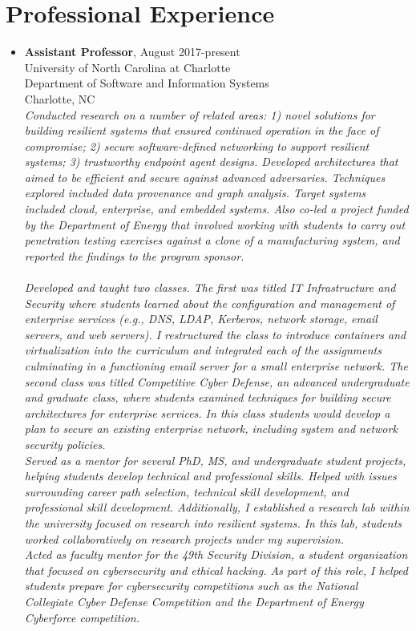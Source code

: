 \documentclass[10pt]{article}
\providecommand{\tightlist}{%
  \setlength{\itemsep}{0.25em}}
\begin{document}
\hypertarget{professional-experience}{%
\section{Professional Experience}\label{professional-experience}}

\begin{itemize}
\tightlist
\item \textbf{Assistant Professor}, August 2017-present\\
  University of North Carolina at Charlotte\\
  Department of Software and Information Systems\\
  Charlotte, NC\\
  \textit{
Conducted research on a number of related areas: 1) novel solutions for building resilient systems that ensured continued operation in the face of compromise; 2) secure software-defined networking to support resilient systems; 3) trustworthy endpoint agent designs. Developed architectures that aimed to be efficient and secure against advanced adversaries. Techniques explored included data provenance and graph analysis. Target systems included cloud, enterprise, and embedded systems. Also co-led a project funded by the Department of Energy that involved working with students to carry out penetration testing exercises against a clone of a manufacturing system, and reported the findings to the program sponsor.\\
\mbox{}\\
Developed and taught two classes. The first was titled IT Infrastructure and Security where students learned about the configuration and management of enterprise services (e.g., DNS, LDAP, Kerberos, network storage, email servers, and web servers). I restructured the class to introduce containers and virtualization into the curriculum and integrated each of the assignments culminating in a functioning email server for a small enterprise network. The second class was titled Competitive Cyber Defense, an advanced undergraduate and graduate class, where students examined techniques for building secure architectures for enterprise services. In this class students would develop a plan to secure an existing enterprise network, including system and network security policies.
\mbox{}\\
Served as a mentor for several PhD, MS, and undergraduate student projects, helping students develop technical and professional skills. Helped with issues surrounding career path selection, technical skill development, and professional skill development. Additionally, I established a research lab within the university focused on research into resilient systems. In this lab, students worked collaboratively on research projects under my supervision.
\mbox{}\\
Acted as faculty mentor for the 49th Security Division, a student organization that focused on cybersecurity and ethical hacking. As part of this role, I helped students prepare for cybersecurity competitions such as the National Collegiate Cyber Defense Competition and the Department of Energy Cyberforce competition.}


\end{itemize}
\end{document}
